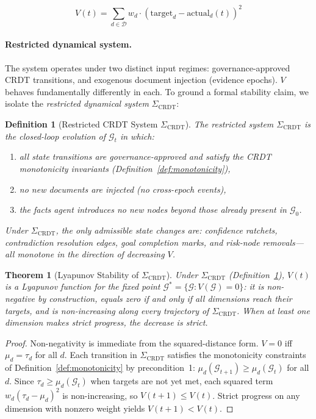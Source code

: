 \documentclass[11pt]{article}
\newtheorem{definition}{Definition}
\newtheorem{theorem}{Theorem}
\begin{document}
\[
V(t) = \sum_{d \in \mathcal{D}} w_d \cdot (\text{target}_d - \text{actual}_d(t))^2
\]

\paragraph{Restricted dynamical system.}
The system operates under two distinct input regimes: governance-approved CRDT transitions, and exogenous document injection (evidence epochs). $V$ behaves fundamentally differently in each. To ground a formal stability claim, we isolate the \emph{restricted dynamical system} $\Sigma_{\mathrm{CRDT}}$:

\begin{definition}[Restricted CRDT System $\Sigma_{\mathrm{CRDT}}$]
\label{def:restricted-system}
The restricted system $\Sigma_{\mathrm{CRDT}}$ is the closed-loop evolution of $\mathcal{G}_t$ in which:
\begin{enumerate}
  \item all state transitions are governance-approved and satisfy the CRDT monotonicity invariants (Definition~\ref{def:monotonicity}),
  \item no new documents are injected (no cross-epoch events),
  \item the facts agent introduces no new nodes beyond those already present in $\mathcal{G}_0$.
\end{enumerate}
Under $\Sigma_{\mathrm{CRDT}}$, the only admissible state changes are: confidence ratchets, contradiction resolution edges, goal completion marks, and risk-node removals---all monotone in the direction of decreasing $V$.
\end{definition}

\begin{theorem}[Lyapunov Stability of $\Sigma_{\mathrm{CRDT}}$]
\label{thm:lyapunov}
Under $\Sigma_{\mathrm{CRDT}}$ (Definition~\ref{def:restricted-system}), $V(t)$ is a Lyapunov function for the fixed point $\mathcal{G}^* = \{\mathcal{G} : V(\mathcal{G}) = 0\}$: it is non-negative by construction, equals zero if and only if all dimensions reach their targets, and is non-increasing along every trajectory of $\Sigma_{\mathrm{CRDT}}$. When at least one dimension makes strict progress, the decrease is strict.
\end{theorem}

\begin{proof}
Non-negativity is immediate from the squared-distance form. $V = 0$ iff $\mu_d = \tau_d$ for all $d$. Each transition in $\Sigma_{\mathrm{CRDT}}$ satisfies the monotonicity constraints of Definition~\ref{def:monotonicity} by precondition~1: $\mu_d(\mathcal{G}_{t+1}) \geq \mu_d(\mathcal{G}_t)$ for all $d$. Since $\tau_d \geq \mu_d(\mathcal{G}_t)$ when targets are not yet met, each squared term $w_d(\tau_d - \mu_d)^2$ is non-increasing, so $V(t+1) \leq V(t)$. Strict progress on any dimension with nonzero weight yields $V(t+1) < V(t)$.
\end{proof}
\end{document}
